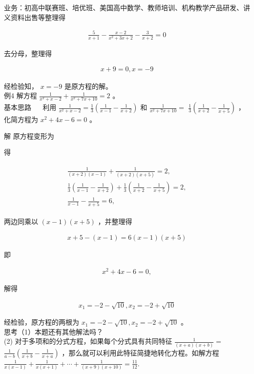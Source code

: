 \documentclass[10pt]{article}
\begin{document}
业务：初高中联赛班、培优班、美国高中数学、教师培训、机构教学产品研发、讲义资料出售等整理得

\begin{align*}
\frac{5}{x+1}-\frac{x-2}{x^{2}+3 x+2}-\frac{3}{x+2}=0
\end{align*}

去分母，整理得

\begin{align*}
x+9=0, x=-9
\end{align*}

经检验知， $x=-9$ 是原方程的解。\\
例4 解方程 $\frac{1}{x^{2}+x-2}+\frac{1}{x^{2}+7 x+10}=2$ 。\\
基本思路 $\quad$ 利用 $\frac{1}{x^{2}+x-2}=\frac{1}{3}\left(\frac{1}{x-1}-\frac{1}{x+2}\right)$ 和 $\frac{1}{x^{2}+7 x+10}=$ $\frac{1}{3}\left(\frac{1}{x+2}-\frac{1}{x+5}\right)$ ，化简方程为 $x^{2}+4 x-6=0$ 。

解 原方程变形为

得

\begin{align*}
\begin{gathered}
\frac{1}{(x+2)(x-1)}+\frac{1}{(x+2)(x+5)}=2, \\
\frac{1}{3}\left(\frac{1}{x-1}-\frac{1}{x+2}\right)+\frac{1}{3}\left(\frac{1}{x+2}-\frac{1}{x+5}\right)=2, \\
\frac{1}{x-1}-\frac{1}{x+5}=6,
\end{gathered}
\end{align*}

两边同乘以 $(x-1)(x+5)$ ，并整理得

\begin{align*}
x+5-(x-1)=6(x-1)(x+5)
\end{align*}

即

\begin{align*}
x^{2}+4 x-6=0,
\end{align*}

解得

\begin{align*}
x_{1}=-2-\sqrt{10}, x_{2}=-2+\sqrt{10}
\end{align*}

经检验，原方程的两根为 $x_{1}=-2-\sqrt{10}, x_{2}=-2+\sqrt{10}$ 。\\
思考（1）本题还有其他解法吗？\\
(2) 对于多项和的分式方程，如果每个分式具有共同特征 $\frac{1}{(x+a)(x+b)}=$ $\frac{1}{a-b}\left(\frac{1}{x+b}-\frac{1}{x+a}\right)$ ，那么就可以利用此特征简捷地转化方程。如解方程 $\frac{1}{x(x-1)}+\frac{1}{x(x+1)}+\cdots+\frac{1}{(x+9)(x+10)}=\frac{11}{12}$.
\end{document}

